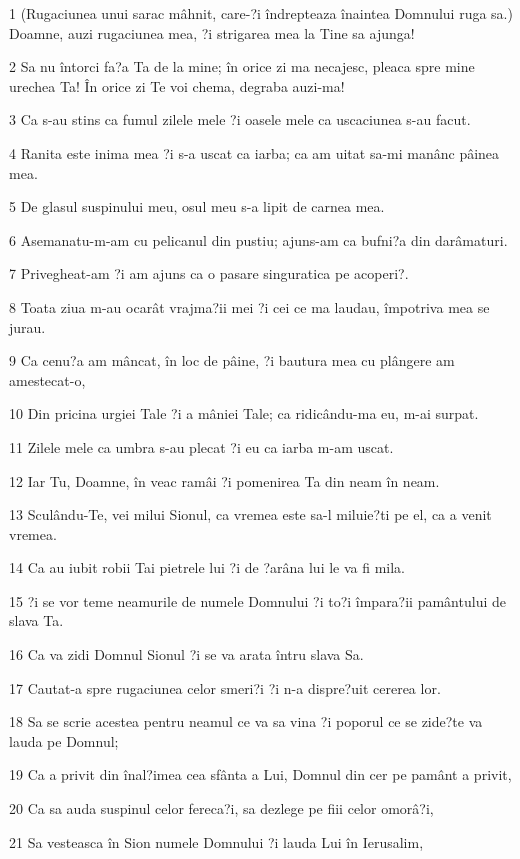 \par 1 (Rugaciunea unui sarac mâhnit, care-?i îndrepteaza înaintea Domnului ruga sa.) Doamne, auzi rugaciunea mea, ?i strigarea mea la Tine sa ajunga!
\par 2 Sa nu întorci fa?a Ta de la mine; în orice zi ma necajesc, pleaca spre mine urechea Ta! În orice zi Te voi chema, degraba auzi-ma!
\par 3 Ca s-au stins ca fumul zilele mele ?i oasele mele ca uscaciunea s-au facut.
\par 4 Ranita este inima mea ?i s-a uscat ca iarba; ca am uitat sa-mi manânc pâinea mea.
\par 5 De glasul suspinului meu, osul meu s-a lipit de carnea mea.
\par 6 Asemanatu-m-am cu pelicanul din pustiu; ajuns-am ca bufni?a din darâmaturi.
\par 7 Privegheat-am ?i am ajuns ca o pasare singuratica pe acoperi?.
\par 8 Toata ziua m-au ocarât vrajma?ii mei ?i cei ce ma laudau, împotriva mea se jurau.
\par 9 Ca cenu?a am mâncat, în loc de pâine, ?i bautura mea cu plângere am amestecat-o,
\par 10 Din pricina urgiei Tale ?i a mâniei Tale; ca ridicându-ma eu, m-ai surpat.
\par 11 Zilele mele ca umbra s-au plecat ?i eu ca iarba m-am uscat.
\par 12 Iar Tu, Doamne, în veac ramâi ?i pomenirea Ta din neam în neam.
\par 13 Sculându-Te, vei milui Sionul, ca vremea este sa-l miluie?ti pe el, ca a venit vremea.
\par 14 Ca au iubit robii Tai pietrele lui ?i de ?arâna lui le va fi mila.
\par 15 ?i se vor teme neamurile de numele Domnului ?i to?i împara?ii pamântului de slava Ta.
\par 16 Ca va zidi Domnul Sionul ?i se va arata întru slava Sa.
\par 17 Cautat-a spre rugaciunea celor smeri?i ?i n-a dispre?uit cererea lor.
\par 18 Sa se scrie acestea pentru neamul ce va sa vina ?i poporul ce se zide?te va lauda pe Domnul;
\par 19 Ca a privit din înal?imea cea sfânta a Lui, Domnul din cer pe pamânt a privit,
\par 20 Ca sa auda suspinul celor fereca?i, sa dezlege pe fiii celor omorâ?i,
\par 21 Sa vesteasca în Sion numele Domnului ?i lauda Lui în Ierusalim,
